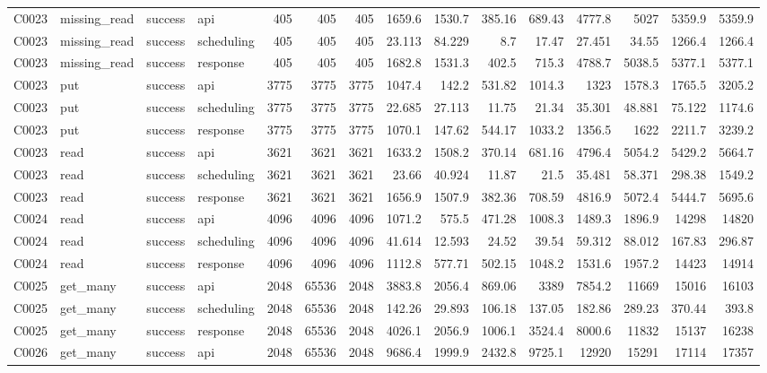\begin{landscape}
\begin{longtable}{llllrrrrrrrrrrr}
C0023 & missing\_\allowbreak{}read & success & api & 405 & 405 & 405 & 1659.6 & 1530.7 & 385.16 & 689.43 & 4777.8 & 5027 & 5359.9 & 5359.9\\
C0023 & missing\_\allowbreak{}read & success & scheduling & 405 & 405 & 405 & 23.113 & 84.229 & 8.7 & 17.47 & 27.451 & 34.55 & 1266.4 & 1266.4\\
C0023 & missing\_\allowbreak{}read & success & response & 405 & 405 & 405 & 1682.8 & 1531.3 & 402.5 & 715.3 & 4788.7 & 5038.5 & 5377.1 & 5377.1\\
C0023 & put & success & api & 3775 & 3775 & 3775 & 1047.4 & 142.2 & 531.82 & 1014.3 & 1323 & 1578.3 & 1765.5 & 3205.2\\
C0023 & put & success & scheduling & 3775 & 3775 & 3775 & 22.685 & 27.113 & 11.75 & 21.34 & 35.301 & 48.881 & 75.122 & 1174.6\\
C0023 & put & success & response & 3775 & 3775 & 3775 & 1070.1 & 147.62 & 544.17 & 1033.2 & 1356.5 & 1622 & 2211.7 & 3239.2\\
C0023 & read & success & api & 3621 & 3621 & 3621 & 1633.2 & 1508.2 & 370.14 & 681.16 & 4796.4 & 5054.2 & 5429.2 & 5664.7\\
C0023 & read & success & scheduling & 3621 & 3621 & 3621 & 23.66 & 40.924 & 11.87 & 21.5 & 35.481 & 58.371 & 298.38 & 1549.2\\
C0023 & read & success & response & 3621 & 3621 & 3621 & 1656.9 & 1507.9 & 382.36 & 708.59 & 4816.9 & 5072.4 & 5444.7 & 5695.6\\
C0024 & read & success & api & 4096 & 4096 & 4096 & 1071.2 & 575.5 & 471.28 & 1008.3 & 1489.3 & 1896.9 & 14298 & 14820\\
C0024 & read & success & scheduling & 4096 & 4096 & 4096 & 41.614 & 12.593 & 24.52 & 39.54 & 59.312 & 88.012 & 167.83 & 296.87\\
C0024 & read & success & response & 4096 & 4096 & 4096 & 1112.8 & 577.71 & 502.15 & 1048.2 & 1531.6 & 1957.2 & 14423 & 14914\\
C0025 & get\_\allowbreak{}many & success & api & 2048 & 65536 & 2048 & 3883.8 & 2056.4 & 869.06 & 3389 & 7854.2 & 11669 & 15016 & 16103\\
C0025 & get\_\allowbreak{}many & success & scheduling & 2048 & 65536 & 2048 & 142.26 & 29.893 & 106.18 & 137.05 & 182.86 & 289.23 & 370.44 & 393.8\\
C0025 & get\_\allowbreak{}many & success & response & 2048 & 65536 & 2048 & 4026.1 & 2056.9 & 1006.1 & 3524.4 & 8000.6 & 11832 & 15137 & 16238\\
C0026 & get\_\allowbreak{}many & success & api & 2048 & 65536 & 2048 & 9686.4 & 1999.9 & 2432.8 & 9725.1 & 12920 & 15291 & 17114 & 17357\\

\end{longtable}
\end{landscape}
